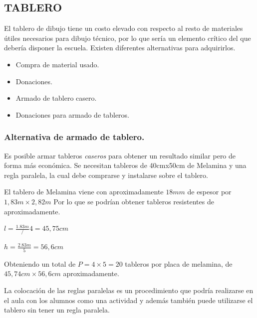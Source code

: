 \newpage
\subsection{TABLERO}
El tablero de dibujo tiene un costo elevado con respecto al resto de materiales útiles necesarios para dibujo técnico, por lo que sería un elemento crítico del que debería disponer la escuela. 
Existen diferentes alternativas para adquirirlos.

\begin{itemize}
    \item Compra de material usado.
    \item Donaciones.
    \item Armado de tablero casero.
    \item Donaciones para armado de tableros.
\end{itemize}

\subsubsection{Alternativa de armado de tablero.}

Es posible armar tableros \emph{caseros} para obtener un resultado similar pero de forma más económica. Se necesitan tableros de 40cmx50cm de Melamina y una regla paralela, la cual debe comprarse y instalarse sobre el tablero.


El tablero de Melamina viene con aproximadamente $18mm$ de espesor por  $1,83m \times 2,82m$ Por lo que se podrían obtener tableros resistentes de aproximadamente.

$l=\frac{1.83m}/{4}=45,75cm$

$h=\frac{2.83m}{5}=56,6cm$

Obteniendo un total de $P=4\times5=20$ tableros por placa de melamina, de $45,74cm  \times 56,6cm$ aproximadamente.

La colocación de las reglas paralelas es un procedimiento que podría realizarse en el aula con los alumnos como una actividad y además también puede utilizarse el tablero sin tener un regla paralela.


